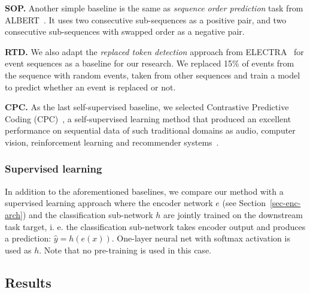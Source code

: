 \documentclass[sigconf, anonymous]{acmart}
\begin{document}
\textbf{SOP.} Another simple baseline is the same as \textit{sequence order prediction} task from ALBERT~\citep{Lan2020ALBERTAL}. It uses two consecutive sub-sequences as a positive pair, and two consecutive sub-sequences with swapped order as a negative pair.

\textbf{RTD.} We also adapt the \textit{replaced token detection} approach from ELECTRA~\citep{Clark2020ELECTRAPT} for event sequences as a baseline for our research. We replaced 15\% of events from the sequence with random events, taken from other sequences and train a model to predict whether an event is replaced or not.

\textbf{CPC.} As the last self-supervised baseline, we selected Contrastive Predictive Coding (CPC)~\citep{Oord2018RepresentationLW}, a self-supervised learning method that produced an excellent performance on sequential data of such traditional domains as audio, computer vision, reinforcement learning and recommender systems~\citep{Zhou2020ContrastiveLF}.

\subsubsection{Supervised learning}

In addition to the aforementioned baselines, we compare our method with a supervised learning approach where the encoder network $e$ (see Section~\ref{sec-enc-arch}) and the classification sub-network $h$ are jointly trained on the downstream task target, i. e. the classification sub-network takes encoder output and produces a prediction: $\hat{y} = h(e(x))$. One-layer neural net with softmax activation is used as $h$. Note that no pre-training is used in this case.

\subsection{Results} \label{sec-res}
\end{document}
